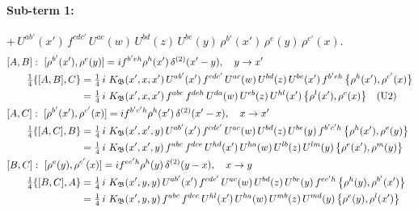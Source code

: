 \documentclass[10pt]{article}
\numberwithin{equation}{section}
\begin{document}
\paragraph{Sub-term 1:} $+\,U^{ab'}(x')\,f^{cdc'}\,U^{ac}(w)\,U^{bd}(z)\,U^{be}(y)\,\rho^{b'}(x')\,\rho^{e}(y)\,\rho^{c'}(x)$.
\begin{align}
&[A,B]:\ [\rho^{b'}(x'),\rho^{e}(y)]=i f^{b'eh}\rho^{h}(x')\,\delta^{(2)}(x'-y),\quad y\to x'\notag\\
&\qquad \tfrac14\{[A,B],C\}=\tfrac14\,i\,\,K_{\mathfrak B}(x',x,x')\,U^{ab'}(x')\,f^{cdc'}\,U^{ac}(w)\,U^{bd}(z)\,U^{be}(x')\,f^{b'eh}\,\big\{\rho^{h}(x'),\rho^{c'}(x)\big\}\notag\\
&\qquad\phantom{\tfrac14\{[A,B],C\}}=\tfrac14\,i\,\,K_{\mathfrak B}(x',x,x')\,f^{abc}\,f^{deh}\,U^{da}(w)\,U^{eb}(z)\,U^{hl}(x')\,\big\{\rho^{l}(x'),\rho^{c}(x)\big\}\quad\text{(U2)}
\label{eq:GI.IV-1-AB}\\
&[A,C]:\ [\rho^{b'}(x'),\rho^{c'}(x)]=i f^{b'c'h}\rho^{h}(x')\,\delta^{(2)}(x'-x),\quad x\to x'\notag\\
&\qquad \tfrac14\{[A,C],B\}=\tfrac14\,i\,\,K_{\mathfrak B}(x',x',y)\,U^{ab'}(x')\,f^{cdc'}\,U^{ac}(w)\,U^{bd}(z)\,U^{be}(y)\,f^{b'c'h}\,\big\{\rho^{h}(x'),\rho^{e}(y)\big\}\notag\\
&\qquad\phantom{\tfrac14\{[A,C],B\}}=\tfrac14\,i\,\,K_{\mathfrak B}(x',x',y)\,f^{abc}\,f^{dce}\,U^{hd}(x')\,U^{ha}(w)\,U^{lb}(z)\,U^{lm}(y)\,\big\{\rho^{e}(x'),\rho^{m}(y)\big\}
\label{eq:GI.IV-1-AC}\\
&[B,C]:\ [\rho^{e}(y),\rho^{c'}(x)]=i f^{ec'h}\rho^{h}(y)\,\delta^{(2)}(y-x),\quad x\to y\notag\\
&\qquad \tfrac14\{[B,C],A\}=\tfrac14\,i\,\,K_{\mathfrak B}(x',y,y)\,U^{ab'}(x')\,f^{cdc'}\,U^{ac}(w)\,U^{bd}(z)\,U^{be}(y)\,f^{ec'h}\,\big\{\rho^{h}(y),\rho^{b'}(x')\big\}\notag\\
&\qquad\phantom{\tfrac14\{[B,C],A\}}=\tfrac14\,i\,\,K_{\mathfrak B}(x',y,y)\,f^{abc}\,f^{dce}\,U^{hl}(x')\,U^{ha}(w)\,U^{mb}(z)\,U^{md}(y)\,\big\{\rho^{e}(y),\rho^{l}(x')\big\}
\label{eq:GI.IV-1-BC}
\end{align}
\end{document}
